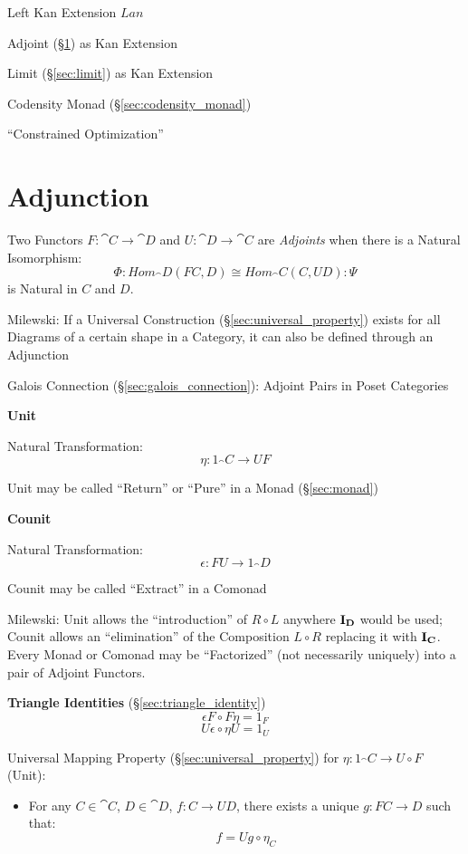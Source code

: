 Left Kan Extension $Lan$

Adjoint (\S\ref{sec:adjunction}) as Kan Extension

Limit (\S\ref{sec:limit}) as Kan Extension

Codensity Monad (\S\ref{sec:codensity_monad})

``Constrained Optimization'' %



\section{Adjunction}\label{sec:adjunction}


Two Functors $F : \cat{C} \rightarrow \cat{D}$ and $U : \cat{D}
\rightarrow \cat{C}$ are \emph{Adjoints} when there is a Natural
Isomorphism:
\[
  \Phi : Hom_\cat{D}(F C,D) \cong Hom_\cat{C}(C,U D) : \Psi
\]
is Natural in $C$ and $D$.


Milewski: If a Universal Construction (\S\ref{sec:universal_property})
exists for all Diagrams of a certain shape in a Category, it can also
be defined through an Adjunction

\fist Galois Connection (\S\ref{sec:galois_connection}): Adjoint
Pairs in Poset Categories


\textbf{Unit}

Natural Transformation:
\[
  \eta : 1_\cat{C} \rightarrow U F
\]

\fist Unit may be called ``Return'' or ``Pure'' in a Monad
(\S\ref{sec:monad})


\textbf{Counit}

Natural Transformation:
\[
  \epsilon : F U \rightarrow 1_\cat{D}
\]

\fist Counit may be called ``Extract'' in a Comonad


Milewski: Unit allows the ``introduction'' of $R \circ L$ anywhere
$\mathbf{I}_\mathbf{D}$ would be used; Counit allows an ``elimination'' of the
Composition $L \circ R$ replacing it with $\mathbf{I}_\mathbf{C}$. Every Monad
or Comonad may be ``Factorized'' (not necessarily uniquely) into a
pair of Adjoint Functors.


\textbf{Triangle Identities} (\S\ref{sec:triangle_identity})
\[
  \epsilon F \circ F \eta = 1_F
\]\[
  U \epsilon \circ \eta U = 1_U
\]


Universal Mapping Property (\S\ref{sec:universal_property}) for $\eta
: 1_\cat{C} \rightarrow U \circ F$ (Unit):
\begin{itemize}
\item For any $C \in \cat{C}$, $D \in \cat{D}$, $f : C
  \rightarrow U D$, there exists a unique $g : FC \rightarrow D$ such
  that:
  \[
    f = U g \circ \eta_C
  \]
\end{itemize}


